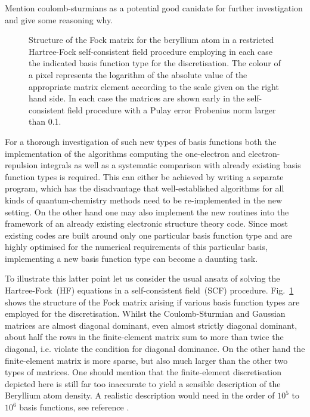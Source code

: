 Mention coulomb-sturmians as a potential good canidate for further
investigation and give some reasoning why.


\begin{figure}
	\centering
	\caption{
		Structure of the Fock matrix for the beryllium atom
		in a restricted Hartree-Fock self-consistent field procedure
		employing in each case the indicated basis function type
		for the discretisation.
		The colour of a pixel represents the logarithm
		of the absolute value of the appropriate matrix element
		according to the scale given on the right hand side.
		In each case the matrices are shown early in the self-consistent
		field procedure with a Pulay error Frobenius norm larger than 0.1.
	}
	\label{fig:FockStructure}
\end{figure}

For a thorough investigation of such new types of basis functions
both the implementation of the algorithms computing
the one-electron and electron-repulsion integrals
as well as a systematic comparison
with already existing basis function types is required.
This can either be achieved by writing a separate program,
which has the disadvantage that well-established algorithms
for all kinds of quantum-chemistry methods need to be re-implemented
in the new setting.
On the other hand one may also implement
the new routines into the framework of an already existing
electronic structure theory code.
Since most existing codes
are built around only one particular basis function type
and are highly optimised for the numerical requirements
of this particular basis,
implementing a new basis function type can become a daunting task.

To illustrate this latter point let us consider
the usual ansatz of solving the Hartree-Fock~(HF) equations
in a self-consistent field~(SCF) procedure.
Fig.~\ref{fig:FockStructure} shows the structure of the Fock matrix
arising if various basis function types are employed for the discretisation.
Whilst the 
Coulomb-Sturmian and Gaussian matrices are almost
diagonal dominant, even almost strictly diagonal dominant,
about half the rows in the finite-element matrix
sum to more than twice the diagonal,
i.e. violate the condition for diagonal dominance.
On the other hand the finite-element matrix is more sparse,
but also much larger than the other two types of matrices.
One should mention that the finite-element discretisation depicted here
is still far too inaccurate to yield a sensible description
of the Beryllium atom density.
A realistic description would need in the order of $10^5$ to $10^6$ basis
functions, see \eg reference \cite{Davydov2015}.

